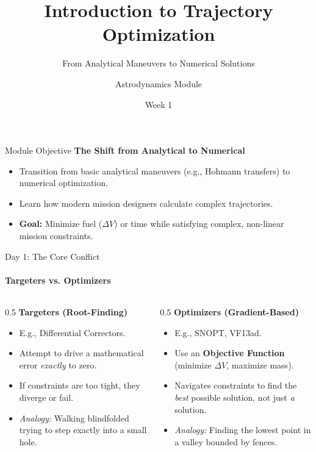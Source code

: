 \documentclass[aspectratio=169]{beamer}
\title[Trajectory Optimization]{Introduction to Trajectory Optimization}
\subtitle{From Analytical Maneuvers to Numerical Solutions}
\author{Astrodynamics Module}
\date{Week 1}
\begin{document}
\begin{frame}
    \titlepage
\end{frame}

\begin{frame}{Module Objective}
    \textbf{The Shift from Analytical to Numerical}
    \vspace{0.5cm}
    \begin{itemize}
        \item Transition from basic analytical maneuvers (e.g., Hohmann transfers) to numerical optimization.
        \item Learn how modern mission designers calculate complex trajectories.
        \item \textbf{Goal:} Minimize fuel ($\Delta V$) or time while satisfying complex, non-linear mission constraints.
    \end{itemize}
\end{frame}

\begin{frame}{Day 1: The Core Conflict}
    \framesubtitle{Targeters vs. Optimizers}
    
    \begin{columns}
        \begin{column}{0.5\textwidth}
            \textbf{Targeters (Root-Finding)}
            \begin{itemize}
                \item E.g., Differential Correctors.
                \item Attempt to drive a mathematical error \textit{exactly} to zero.
                \item If constraints are too tight, they diverge or fail.
                \item \textit{Analogy:} Walking blindfolded trying to step exactly into a small hole.
            \end{itemize}
        \end{column}
        
        \begin{column}{0.5\textwidth}
            \textbf{Optimizers (Gradient-Based)}
            \begin{itemize}
                \item E.g., SNOPT, VF13ad.
                \item Use an \textbf{Objective Function} (minimize $\Delta V$, maximize mass).
                \item Navigates constraints to find the \textit{best} possible solution, not just \textit{a} solution.
                \item \textit{Analogy:} Finding the lowest point in a valley bounded by fences.
            \end{itemize}
        \end{column}
    \end{columns}
\end{frame}
\end{document}
